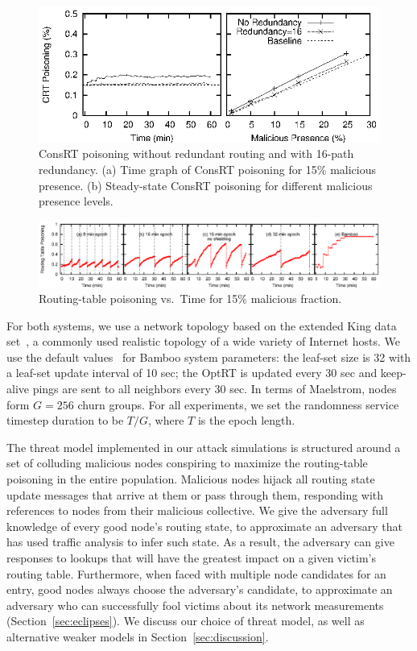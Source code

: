 \documentclass[10pt,twocolumn]{article}
\newcommand{\PRT}{OptRT\xspace}
\newcommand{\CRT}{ConsRT\xspace}
\begin{document}
\begin{figure}
\centerline{\includegraphics{graphs/crtPoisoning}}
\caption{\CRT poisoning without redundant routing and with
  16-path redundancy.  (a) Time graph of \CRT poisoning for 15\% malicious
  presence.  (b) Steady-state \CRT poisoning for different malicious
  presence levels.}
\label{fig:crtPoisoning}
\end{figure}

\begin{figure}
\begin{center}
\centerline{\includegraphics{graphs/timeGraph.eps}}
\caption{Routing-table poisoning vs.\ Time for 15\% malicious
fraction.}
\label{fig:timeGraph}
\end{center}
\end{figure}

For both systems, we use a network topology based on the extended King
data set~\cite{Gummadi2002}, a commonly used realistic topology of a wide
variety of Internet
hosts.  We use the default values~\cite{Rhea2004} for Bamboo 
system parameters: the leaf-set size is 32 with a leaf-set update
interval of 10 sec; the \PRT is updated every 30 sec and keep-alive
pings are sent to all neighbors every 30 sec.  In terms of Maelstrom, nodes form $G=256$ churn
groups.  For all experiments, we set the randomness service timestep
duration to be $T/G$, where $T$ is the epoch length.

The threat model implemented in our attack simulations is structured
around a set of colluding malicious nodes conspiring to maximize the
routing-table poisoning in the entire population.
Malicious nodes hijack all routing state update messages that arrive at
them or pass through them, responding
with references to nodes from their malicious collective.
We give the adversary full
knowledge of every good node's routing state, to approximate an
adversary that has used traffic analysis to infer such state.  As a
result, the adversary can give responses to lookups
that will have the greatest impact on a given victim's routing table.  
Furthermore, when faced with multiple node candidates for an entry, good nodes always
choose the adversary's candidate, to approximate an adversary who can
successfully fool victims about its network measurements (Section~\ref{sec:eclipses}).
We discuss
our choice of threat model, as well as alternative weaker models in Section~\ref{sec:discussion}.
\end{document}
